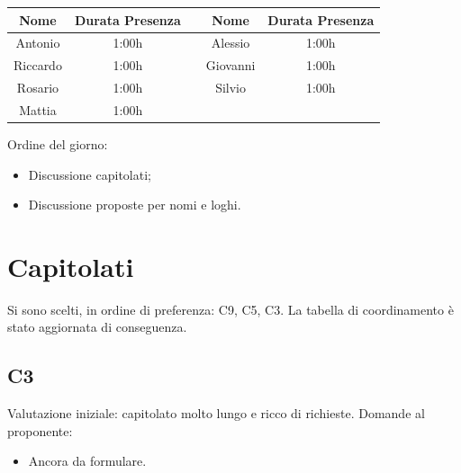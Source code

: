 \documentclass[12pt,a4paper]{article}
\begin{document}
\begin{center}
    \begin{tabular}{ |c|c|c|c|c| }
        \hline
        Nome     & Durata Presenza &  & Nome     & Durata Presenza \\
        \hline
        Antonio  & 1:00h           &  & Alessio  & 1:00h           \\
        \hline
        Riccardo & 1:00h           &  & Giovanni & 1:00h           \\
        \hline
        Rosario  & 1:00h           &  & Silvio   & 1:00h           \\
        \hline
        Mattia   & 1:00h           &  &          &                 \\
        \hline

    \end{tabular}
\end{center}

\newpage

Ordine del giorno:
\begin{itemize}
    \item Discussione capitolati;
    \item Discussione proposte per nomi e loghi.
\end{itemize}

\section{Capitolati}
Si sono scelti, in ordine di preferenza: C9, C5, C3. La tabella di coordinamento è stato aggiornata di conseguenza.

\subsection{C3}
Valutazione iniziale: capitolato molto lungo e ricco di richieste.
Domande al proponente:
\begin{itemize}
    \item Ancora da formulare.
\end{itemize}
\end{document}
